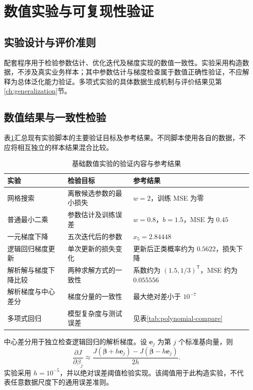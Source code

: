 \section{数值实验与可复现性验证}\label{ch:experiments}

\subsection{实验设计与评价准则}
配套程序用于检验参数估计、优化迭代及梯度实现的数值一致性。实验采用构造数据，不涉及真实业务样本；其中参数估计与梯度检查属于数值正确性验证，不应解释为总体泛化能力验证。多项式实验的具体数据生成机制与评价结果见第\ref{ch:generalization}节。

\subsection{数值结果与一致性检验}
表\ref{tab:validation-results}汇总现有实验脚本的主要验证目标及参考结果。不同脚本使用各自的数据，不应将相互独立的样本结果混合比较。

\begin{table}[htbp]\centering
\caption{基础数值实验的验证内容与参考结果}\label{tab:validation-results}
\begin{tabularx}{\textwidth}{p{34mm}XX}\toprule
实验 & 检验目标 & 参考结果\\\midrule
网格搜索 & 离散候选参数的最小损失 & $w=2$，训练 MSE 为零\\
普通最小二乘 & 参数估计及训练误差 & $w=0.8$，$b=1.5$，MSE 为 $0.45$\\
一元梯度下降 & 五次迭代后的参数 & $x_5=2.84448$\\
逻辑回归梯度更新 & 单次更新的损失变化 & 更新后正类概率约为 $0.5622$，损失下降\\
解析解与梯度下降比较 & 两种求解方式的一致性 & 系数约为 $(1.5,1/3)^{\mathsf T}$，MSE 约为 $0.055556$\\
解析梯度与中心差分 & 梯度分量的一致性 & 最大绝对差小于 $10^{-7}$\\
多项式回归 & 模型复杂度与测试误差 & 见表\ref{tab:polynomial-compare}\\\bottomrule
\end{tabularx}
\end{table}

中心差分用于独立检查逻辑回归的解析梯度。设 $\boldsymbol e_j$ 为第 $j$ 个标准基向量，则
\begin{equation}\label{eq:finite-difference}
\frac{\partial J}{\partial\beta_j}
\approx\frac{J(\boldsymbol\beta+h\boldsymbol e_j)-J(\boldsymbol\beta-h\boldsymbol e_j)}{2h}.
\end{equation}
实验采用 $h=10^{-5}$，并以绝对误差阈值检验实现。该阈值用于此构造实验，不代表任意数据尺度下的通用误差准则。

